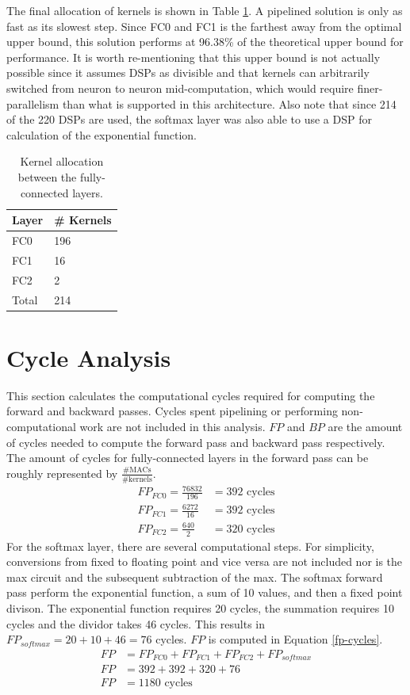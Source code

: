 The final allocation of kernels is shown in Table \ref{dsp-allocat}. A pipelined solution is only as fast as its slowest step. Since FC0 and FC1 is the farthest away from the optimal upper bound, this solution performs at 96.38\% of the theoretical upper bound for performance. It is worth re-mentioning that this upper bound is not actually possible since it assumes DSPs as divisible and that kernels can arbitrarily switched from neuron to neuron mid-computation, which would require finer-parallelism than what is supported in this architecture. Also note that since 214 of the 220 DSPs are used, the softmax layer was also able to use a DSP for calculation of the exponential function.

\begin{table}
	\centering 
	\begin{tabular}{|l|l|}
		\hline 
		Layer & \# Kernels \\\hline
		FC0 & 196 \\\hline
		FC1 & 16 \\\hline
		FC2 & 2	\\\hline
		Total & 214	\\\hline
	\end{tabular}
	\caption{Kernel allocation between the fully-connected layers.}
	\label{dsp-allocat}
\end{table}

\section{Cycle Analysis}
This section calculates the computational cycles required for computing the forward and backward passes. Cycles spent pipelining or performing non-computational work are not included in this analysis. $FP$ and $BP$ are the amount of cycles needed to compute the forward pass and backward pass respectively. The amount of cycles for fully-connected layers in the forward pass can be roughly represented by $\frac{\# \text{MACs}}{\# \text{kernels}}$.
\begin{align}
	FP_{FC0} = \frac{76832}{196} &= 392\text{ cycles}\\	
	FP_{FC1} = \frac{6272}{16} &= 392 \text{ cycles}\\
	FP_{FC2} = \frac{640}{2} &= 320 \text{ cycles}	
\end{align}
For the softmax layer, there are several computational steps. For simplicity, conversions from fixed to floating point and vice versa are not included nor is the max circuit and the subsequent subtraction of the max. The softmax forward pass perform the exponential function, a sum of 10 values, and then a fixed point divison. The exponential function requires 20 cycles, the summation requires 10 cycles and the dividor takes 46 cycles. This results in $FP_{softmax} = 20 + 10 + 46 = 76$ cycles. $FP$ is computed in Equation \ref{fp-cycles}.
\begin{align}
	FP &= FP_{FC0} + FP_{FC1} + FP_{FC2} + FP_{softmax} \\
	FP &= 392 + 392 + 320 + 76\\
	FP &= 1180	 \text{ cycles} \label{fp-cycles}
\end{align}

